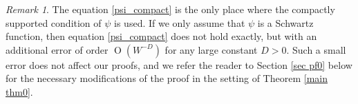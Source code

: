 \documentclass{article}
\newcommand{\1}{\mathds{1}}
\numberwithin{equation}{section}
\newcommand{\fa}{{\mathfrak a}}
\renewcommand{\cal}{\mathcal}
\newcommand{\wt}{\widetilde}
\renewcommand{\leq}{\leqslant}
\renewcommand{\le}{\leq}
\DeclareMathOperator{\OO}{O}
\DeclareMathOperator{\oo}{o}
\theoremstyle{plain} %
\theoremstyle{remark}
\newtheorem{remark}[theorem]{Remark}
\newcommand{\nc}{\normalcolor}
\newcommand{\Sele}{{\mathcal E}}
\newcommand{\Seleinf}{{\mathcal E}^{\infty}}
\newcommand{\Cele}{{\mathscr E}}
\begin{document}
\begin{remark}\label{rem FT0}
The equation \eqref{psi_compact} is the only place where the compactly supported condition of $\psi$ is used. If we only assume that $\psi$ is a Schwartz function, then equation \eqref{psi_compact} does not hold exactly, but with an additional error of order $\OO(W^{-D})$ for any large constant $D>0$. Such a small error does not affect our proofs, and we refer the reader to Section \ref{sec pf0} below for the necessary modifications of the proof in the setting of Theorem \ref{main thm0}. 
\end{remark}

%




\end{document}
